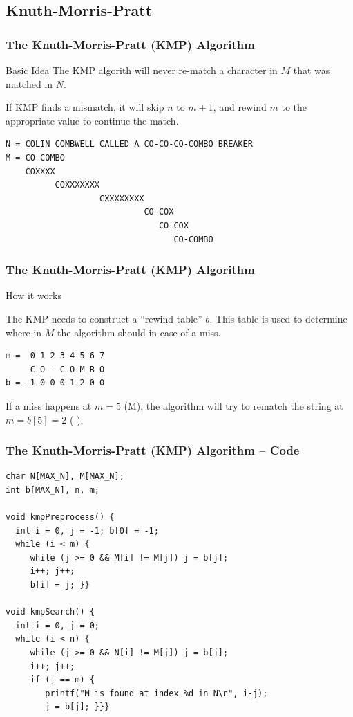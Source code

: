\documentclass{beamer}
\begin{document}
\subsection{Knuth-Morris-Pratt}
\begin{frame}[fragile]
  \frametitle{The Knuth-Morris-Pratt (KMP) Algorithm}
  
  \begin{block}{Basic Idea}
    The KMP algorith will never re-match a character in $M$ that was
    matched in $N$. 

    \bigskip

    If KMP finds a mismatch, it will skip $n$ to $m+1$, and rewind $m$ to the 
    appropriate value to continue the match.
  \end{block}

\begin{verbatim}
N = COLIN COMBWELL CALLED A CO-CO-CO-COMBO BREAKER
M = CO-COMBO
    COXXXX
          COXXXXXXX
                   CXXXXXXXX
                            CO-COX
                               CO-COX
                                  CO-COMBO 
\end{verbatim}
\end{frame}


\begin{frame}[fragile]
  \frametitle{The Knuth-Morris-Pratt (KMP) Algorithm}
  {\smaller
    \begin{block}{How it works}

      The KMP needs to construct a ``rewind table'' $b$. This
      table is used to determine where in $M$ the algorithm
      should  in case of a miss.
      
\begin{verbatim}
m =  0 1 2 3 4 5 6 7
     C O - C O M B O
b = -1 0 0 0 1 2 0 0
\end{verbatim}

If a miss happens at $m=5$ (M), the algorithm will try to rematch the
string at $m=b[5]=2$ (-).
    \end{block}
  }
\end{frame}

\begin{frame}[fragile]
  \frametitle{The Knuth-Morris-Pratt (KMP) Algorithm -- Code}
  {\smaller
  \begin{exampleblock}{}
\begin{verbatim}
char N[MAX_N], M[MAX_N]; 
int b[MAX_N], n, m;

void kmpPreprocess() {
  int i = 0, j = -1; b[0] = -1;
  while (i < m) {
     while (j >= 0 && M[i] != M[j]) j = b[j];
     i++; j++;
     b[i] = j; }}

void kmpSearch() {
  int i = 0, j = 0;
  while (i < n) {
     while (j >= 0 && N[i] != M[j]) j = b[j];
     i++; j++;
     if (j == m) {
        printf("M is found at index %d in N\n", i-j);
        j = b[j]; }}}
\end{verbatim}
  \end{exampleblock}
  }
\end{frame}
\end{document}
